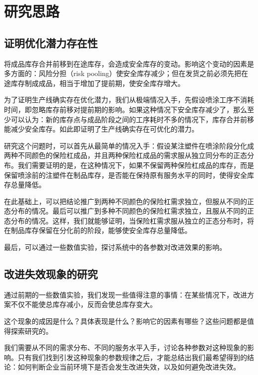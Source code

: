 \chapter{研究思路}

\section{证明优化潜力存在性}

将成品库存合并前移到在途库存，会造成安全库存的变动。影响这个变动的因素是多方面的：风险分担（risk pooling）使安全库存减少；但在发货之前必须先把在途库存制成成品，相当于增加了提前期，使安全库存增大。

为了证明生产线确实存在优化潜力，我们从极端情况入手，先假设喷涂工序不消耗时间，即忽略库存前移对提前期的影响。如果这种情况下安全库存减少了，那么至少可以认为：新的库存点与成品阶段之间的工序耗时不多的情况下，库存合并前移能减少安全库存。如此即证明了生产线确实存在可优化的潜力。

研究这个问题时，可以首先从最简单的情况入手：假设某注塑件在喷涂阶段分化成两种不同颜色的保险杠成品，并且两种保险杠成品的需求服从独立同分布的正态分布。我们需要证明的是，在这种情况下，如果不保留两种保险杠成品的库存，而是保留喷涂前的注塑件在制品库存，是否能在保持原有服务水平的同时，使得安全库存总量降低。

在此基础上，可以把结论推广到两种不同颜色的保险杠需求独立，但服从不同的正态分布的情况。最后可以推广到多种不同颜色的保险杠需求独立，且服从不同的正态分布的情况。这样，我们就能够证明，当保险杠需求服从独立的正态分布时，将在制品库存保留在分化前的阶段，能够使安全库存总量降低。

最后，可以通过一些数值实验，探讨系统中的各参数对改进效果的影响。




\section{改进失效现象的研究}

通过前期的一些数值实验，我们发现一些值得注意的事情：在某些情况下，改进方案不仅不能使总库存减小，反而会使总库存变大。

这个现象的成因是什么？具体表现是什么？影响它的因素有哪些？这些问题都是值得探索研究的。

我们需要从不同的需求分布、不同的服务水平入手，讨论各种参数对这种现象的影响。只有我们找到引发这种现象的参数规律之后，才能总结出我们最希望得到的结论：如何判断企业当前环境下是否会发生改进失效，以及如何避免改进失效。






